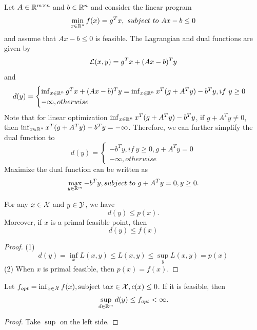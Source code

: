 \begin{refsection}
\begin{example}\cite[lec 2]{Robinson2015convex}
Let $A \in \mathbb{R}^{m\times n}$ and $b\in \mathbb{R}^n$ and consider the linear program 
$$\min_{x\in \mathbb{R}^n} f(x) = g^Tx, ~subject~to~ Ax - b \leq 0$$
and assume that $Ax - b \leq 0$ is feasible. The Lagrangian and dual functions are given by
$$\mathcal{L}(x,y) = g^Tx + (Ax - b)^Ty$$
and
$$d(y) = \begin{cases}
\inf_{x\in \mathbb{R}^n} g^Tx + (Ax - b)^Ty = \inf_{x\in \mathbb{R}^n} x^T(g + A^Ty) - b^Ty, if~ y\geq 0\\
-\infty, otherwise
\end{cases}$$ 
Note that for linear optimization $\inf_{x\in \mathbb{R}^n} x^T(g + A^Ty) - b^Ty$, if $g + A^Ty \neq 0$, then $\inf_{x\in \mathbb{R}^n} x^T(g + A^Ty) - b^Ty = -\infty$. Therefore, we can further simplify the dual function to
$$d(y) = \begin{cases}
 - b^Ty, if~ y\geq 0, g+A^Ty = 0\\
-\infty, otherwise
\end{cases}$$
Maximize the dual function can be written as
$$\max_{y\in \mathbb{R}^m} -b^Ty, subject~to~ g+A^Ty = 0, y\geq 0.$$
\end{example}



\begin{theorem}
	For any $x\in \mathcal{X}$ and $y\in \mathcal{Y}$, we have$$d(y)\leq p(x).$$
Moreover, if $x$ is a primal feasible point, then
$$d(y)\leq f(x)$$
\end{theorem}
\begin{proof}
(1)	$$d(y) = \inf_x L(x,y) \leq L(x,y) \leq \sup_y L(x,y) = p(x)$$
(2) When $x$ is primal feasible, then $p(x) = f(x)$.
\end{proof}

\begin{theorem}
	Let $f_{opt} = \inf_{x\in \mathcal{X}} f(x), \text{subject to} x\in \mathcal{X}, c(x)\leq 0$.
	If it is feasible, then
	$$\sup_{d\in \mathbb{R}^m} d(y) \leq f_{opt} < \infty.$$
\end{theorem}
\begin{proof}
Take $\sup$ on the left side.
\end{proof}

\begin{lemma}
	
	
	
\end{lemma}


\begin{definition}
	

\end{definition}
\end{refsection}
